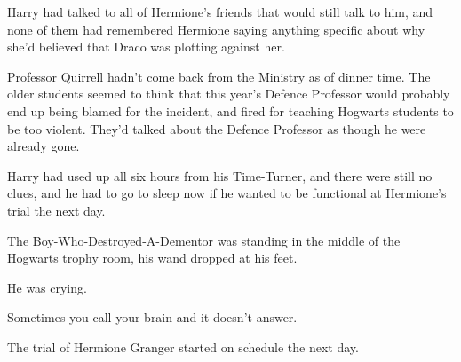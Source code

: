 Harry had talked to all of Hermione's friends that would still talk to him, and
none of them had remembered Hermione saying anything specific about why she'd
believed that Draco was plotting against her.

Professor Quirrell hadn't come back from the Ministry as of dinner time. The
older students seemed to think that this year's Defence Professor would
probably end up being blamed for the incident, and fired for teaching Hogwarts
students to be too violent. They'd talked about the Defence Professor as though
he were already gone.

Harry had used up all six hours from his Time-Turner, and there were still no
clues, and he had to go to sleep now if he wanted to be functional at
Hermione's trial the next day.

The Boy-Who-Destroyed-A-Dementor was standing in the middle of the Hogwarts
trophy room, his wand dropped at his feet.

He was crying.

Sometimes you call your brain and it doesn't answer.

The trial of Hermione Granger started on schedule the next day.
